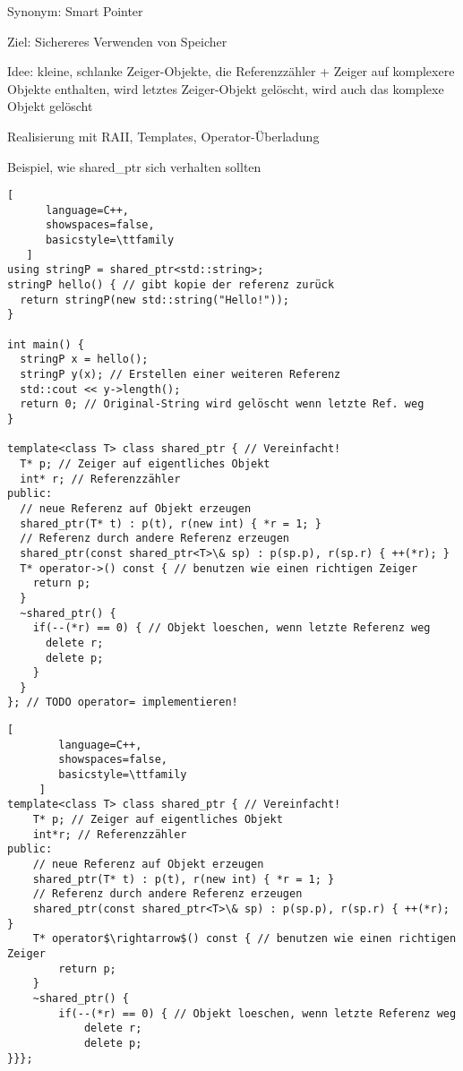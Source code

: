 \documentclass[10pt]{article}
\begin{document}
\begin{itemize*}
\begin{itemize*}
  \item Synonym: Smart Pointer
  \item Ziel: Sichereres Verwenden von Speicher
  \item Idee: kleine, schlanke Zeiger-Objekte, die Referenzzähler + Zeiger auf komplexere Objekte enthalten, wird letztes Zeiger-Objekt gelöscht, wird auch das komplexe Objekt gelöscht
  \item Realisierung mit RAII, Templates, Operator-Überladung
  \item Beispiel, wie shared\_ptr sich verhalten sollten
\end{itemize*}
\begin{lstlisting}[
      language=C++,
      showspaces=false,
      basicstyle=\ttfamily
   ]
using stringP = shared_ptr<std::string>;
stringP hello() { // gibt kopie der referenz zurück
  return stringP(new std::string("Hello!"));
}

int main() {
  stringP x = hello();
  stringP y(x); // Erstellen einer weiteren Referenz
  std::cout << y->length();
  return 0; // Original-String wird gelöscht wenn letzte Ref. weg
}

template<class T> class shared_ptr { // Vereinfacht!
  T* p; // Zeiger auf eigentliches Objekt
  int* r; // Referenzzähler
public:
  // neue Referenz auf Objekt erzeugen
  shared_ptr(T* t) : p(t), r(new int) { *r = 1; }
  // Referenz durch andere Referenz erzeugen
  shared_ptr(const shared_ptr<T>\& sp) : p(sp.p), r(sp.r) { ++(*r); }
  T* operator->() const { // benutzen wie einen richtigen Zeiger
    return p;
  }
  ~shared_ptr() {
    if(--(*r) == 0) { // Objekt loeschen, wenn letzte Referenz weg
      delete r;
      delete p;
    }
  }
}; // TODO operator= implementieren!
\end{lstlisting}

\begin{lstlisting}[
        language=C++,
        showspaces=false,
        basicstyle=\ttfamily
     ]
template<class T> class shared_ptr { // Vereinfacht!
    T* p; // Zeiger auf eigentliches Objekt
    int*r; // Referenzzähler
public:
    // neue Referenz auf Objekt erzeugen
    shared_ptr(T* t) : p(t), r(new int) { *r = 1; }
    // Referenz durch andere Referenz erzeugen
    shared_ptr(const shared_ptr<T>\& sp) : p(sp.p), r(sp.r) { ++(*r); }
    T* operator$\rightarrow$() const { // benutzen wie einen richtigen Zeiger
        return p;
    }
    ~shared_ptr() {
        if(--(*r) == 0) { // Objekt loeschen, wenn letzte Referenz weg
            delete r;
            delete p;
}}};
\end{lstlisting}



\end{itemize*}
\end{document}
